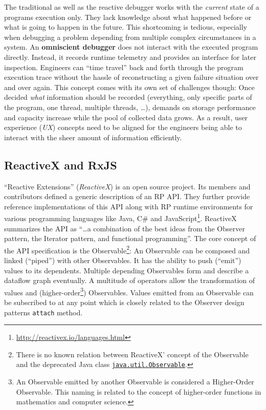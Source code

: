 \documentclass[12pt,a4paper]{article}
\begin{document}
The traditional as well as the reactive debugger works with the \emph{current} state of a programs execution only. They lack knowledge about what happened before or what is going to happen in the future. This shortcoming is tedious, especially when debugging a problem depending from multiple complex circumstances in a system. An \textbf{omniscient debugger} \cite{5287015} \cite{DBLP:journals/corr/OCallahanJFHNP17} does not interact with the executed program directly. Instead, it records runtime telemetry and provides an interface for later inspection. Engineers can ``time travel'' back and forth through the program execution trace without the hassle of reconstructing a given failure situation over and over again. This concept comes with its own set of challenges though: Once decided \emph{what} information should be recorded (everything, only specific parts of the program, one thread, multiple threads, \dots), demands on storage performance and capacity increase while the pool of collected data grows. As a result, user experience (\emph{UX}) concepts need to be aligned for the engineers being able to interact with the sheer amount\cite{5287015} of information efficiently.

\subsection{ReactiveX and RxJS}

``Reactive Extensions'' (\emph{ReactiveX}) is an open source project. Its members and contributors defined a generic description of an RP API. They further provide reference implementations of this API along with RP runtime environments for various programming languages like Java, C\# and JavaScript\footnote{\url{http://reactivex.io/languages.html}}. ReactiveX summarizes the API as ``\dots a combination of the best ideas from the Observer pattern, the Iterator pattern, and functional programming''\cite{reactivex}. The core concept of the API specification is the Observable\footnote{There is no known relation between ReactiveX' concept of the Observable and the deprecated Java class \href{https://docs.oracle.com/en/java/javase/11/docs/api/java.base/java/util/Observable.html}{\texttt{java.util.Observable}}.}: An Observable can be composed and linked (``piped'') with other Observables. It has the ability to push (``emit'') values to its dependents. Multiple depending Observables form and describe a dataflow graph eventually. A multitude of operators allow the transformation of values and (higher-order\footnote{An Observable emitted by another Observable is considered a Higher-Order Observable. This naming is related to the concept of higher-order functions in mathematics and computer science.}) Observables. Values emitted from an Observable can be subscribed to at any point which is closely related to the Observer design patterns \texttt{attach} method.
\end{document}
